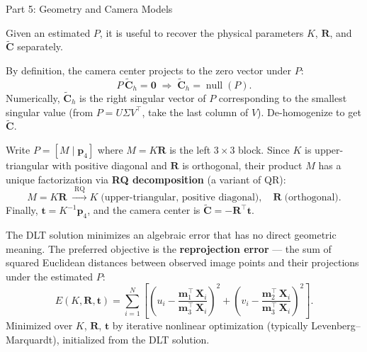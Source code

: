\documentclass[letterpaper]{article}
\begin{document}
\begin{notes}{Part 5: Geometry and Camera Models}

Given an estimated $P$, it is useful to recover the physical parameters
$K$, $\mathbf{R}$, and $\widetilde{\mathbf{C}}$ separately.


By definition, the camera center projects to the zero vector under $P$:
\begin{equation}
  P\,\widetilde{\mathbf{C}}_h = \mathbf{0}
  \;\Longrightarrow\;
  \widetilde{\mathbf{C}}_h = \operatorname{null}(P).
\end{equation}
Numerically, $\widetilde{\mathbf{C}}_h$ is the right singular vector of
$P$ corresponding to the smallest singular value (from $P = U\Sigma V^\top$,
take the last column of $V$).  De-homogenize to get $\widetilde{\mathbf{C}}$.


Write $P = [M \mid \mathbf{p}_4]$ where $M = K\mathbf{R}$ is the
left $3\times 3$ block.  Since $K$ is upper-triangular with positive
diagonal and $\mathbf{R}$ is orthogonal, their product $M$ has a unique
factorization via \textbf{RQ decomposition} (a variant of QR):
\begin{equation}
  M = K\mathbf{R}
  \;\xrightarrow{\;\text{RQ}\;}
  K \;\text{(upper-triangular, positive diagonal)},\quad
  \mathbf{R} \;\text{(orthogonal)}.
\end{equation}
Finally, $\mathbf{t} = K^{-1}\mathbf{p}_4$, and the camera center is
$\widetilde{\mathbf{C}} = -\mathbf{R}^\top\mathbf{t}$.



The DLT solution minimizes an algebraic error that has no direct geometric
meaning.  The preferred objective is the \textbf{reprojection error} ---
the sum of squared Euclidean distances between observed image points and
their projections under the estimated $P$:
\begin{equation}
  E(K,\mathbf{R},\mathbf{t}) = \sum_{i=1}^{N}
      \left[
        \left(u_i - \frac{\mathbf{m}_1^\top\,\mathbf{X}_i}
                         {\mathbf{m}_3^\top\,\mathbf{X}_i}\right)^{\!2}
        +
        \left(v_i - \frac{\mathbf{m}_2^\top\,\mathbf{X}_i}
                         {\mathbf{m}_3^\top\,\mathbf{X}_i}\right)^{\!2}
      \right].
\end{equation}
Minimized over $K$, $\mathbf{R}$, $\mathbf{t}$ by iterative nonlinear
optimization (typically Levenberg--Marquardt), initialized from the DLT
solution.


\end{notes}
\end{document}
